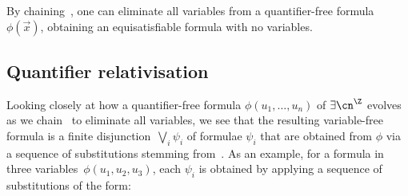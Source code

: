 By chaining~, one can eliminate all variables from a quantifier-free formula $\phi(\vec x)$, obtaining an equisatisfiable
formula with no variables.

\subsection{Quantifier relativisation}
\label{subsection:quantifier-relativisation}

Looking closely at how a quantifier-free formula $\phi(u_1,\dots,u_n)$ of $\exists\ipow{\cn}$ evolves as we chain~ to eliminate all variables, we see that the resulting variable-free formula is a finite disjunction~$\bigvee_{i} \psi_i$ of formulae $\psi_i$ that are obtained from $\phi$ via a sequence of substitutions stemming from~. As an example, for a formula in three variables~$\phi(u_1,u_2,u_3)$, each $\psi_i$ is obtained by applying a sequence of substitutions of the form:
